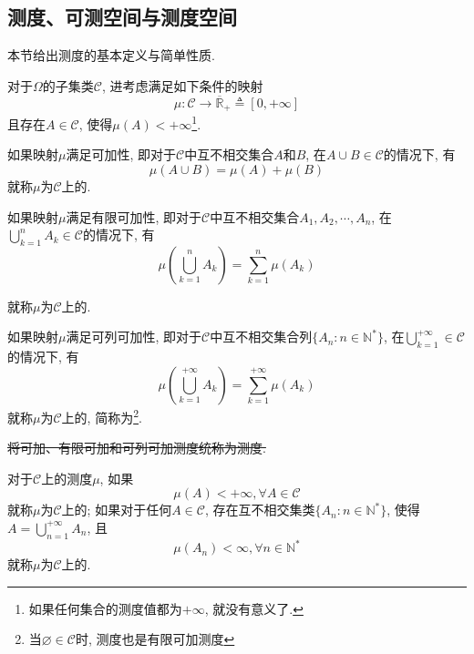 \subsection{测度、可测空间与测度空间}
 本节给出测度的基本定义与简单性质.

 对于$\Omega$的子集类$\mathscr{C}$, 进考虑满足如下条件的映射\begin{equation}
	\mu:\mathscr{C}\to\overline{\mathbb{R}}_{+}\triangleq[0,+\infty]
 \end{equation}
 且存在$A\in\mathscr{C}$, 使得$\mu(A)<+\infty$\footnote{如果任何集合的测度值都为$+\infty$, 就没有意义了.}.

 如果映射$\mu$满足可加性, 即对于$\mathscr{C}$中互不相交集合$A$和$B$, 在$A\cup B\in\mathscr{C}$的情况下, 有
 \begin{equation}
	\mu(A\cup B) = \mu(A) + \mu(B)
 \end{equation}
 就称$\mu$为$\mathscr{C}$上的.

 如果映射$\mu$满足有限可加性, 即对于$\mathscr{C}$中互不相交集合$A_1, A_2,\cdots, A_n$, 在$\bigcup_{k=1}^nA_k\in\mathscr{C}$的情况下, 有
 \begin{equation}
	\mu\left( \bigcup_{k=1}^n A_k \right) = \sum_{k=1}^n\mu(A_k)
 \end{equation}

 就称$\mu$为$\mathscr{C}$上的.

 如果映射$\mu$满足可列可加性, 即对于$\mathscr{C}$中互不相交集合列$\{A_n:n\in\mathbb{N}^* \}$, 在$\bigcup_{k=1}^{+\infty}\in\mathscr{C}$的情况下, 有
 \begin{equation}
	\mu\left( \bigcup_{k=1}^{+\infty} A_k \right) = \sum_{k=1}^{+\infty}\mu(A_k)
 \end{equation}
 就称$\mu$为$\mathscr{C}$上的, 简称为{}\footnote{当$\varnothing\in\mathscr{C}$时, 测度也是有限可加测度}.

 \sout{将可加、有限可加和可列可加测度统称为测度.}

对于$\mathscr{C}$上的测度$\mu$, 如果\begin{equation}
	\mu(A)<+\infty, \forall A\in\mathscr{C}
\end{equation}
就称$\mu$为$\mathscr{C}$上的; 如果对于任何$A\in\mathscr{C}$, 存在互不相交集类$\{A_n:n\in\mathbb{N}^* \}$, 使得$A = \bigcup_{n=1}^{+\infty}A_n$, 且
\begin{equation}
	\mu(A_n)<\infty, \forall n\in\mathbb{N}^*
\end{equation}
就称$\mu$为$\mathscr{C}$上的.

